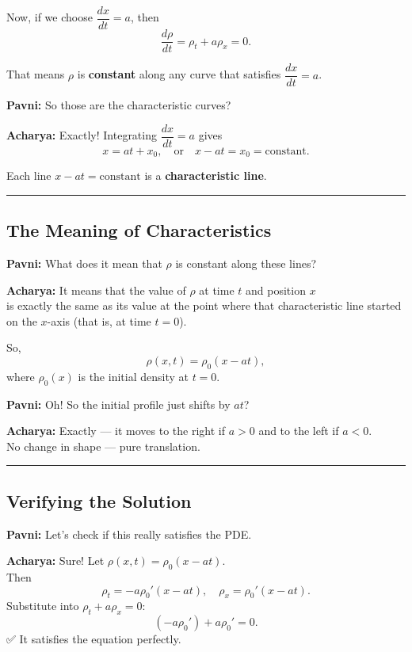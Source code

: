 \documentclass[
  letterpaper,
]{book}
\begin{document}
Now, if we choose \(\dfrac{dx}{dt} = a\), then \[
\frac{d\rho}{dt} = \rho_t + a\rho_x = 0.
\]

That means \(\rho\) is \textbf{constant} along any curve that satisfies
\(\dfrac{dx}{dt} = a\).

\textbf{Pavni:} So those are the characteristic curves?

\textbf{Acharya:} Exactly! Integrating \(\dfrac{dx}{dt} = a\) gives \[
x = a t + x_0, \quad \text{or} \quad x - a t = x_0 = \text{constant}.
\]

Each line \(x - a t = \text{constant}\) is a \textbf{characteristic
line}.

\begin{center}\rule{0.5\linewidth}{0.5pt}\end{center}

\subsection{The Meaning of
Characteristics}\label{the-meaning-of-characteristics}

\textbf{Pavni:} What does it mean that \(\rho\) is constant along these
lines?

\textbf{Acharya:} It means that the value of \(\rho\) at time \(t\) and
position \(x\)\\
is exactly the same as its value at the point where that characteristic
line started on the \(x\)-axis (that is, at time \(t=0\)).

So, \[
\rho(x,t) = \rho_0(x - a t),
\] where \(\rho_0(x)\) is the initial density at \(t=0\).

\textbf{Pavni:} Oh! So the initial profile just shifts by \(a t\)?

\textbf{Acharya:} Exactly --- it moves to the right if \(a>0\) and to
the left if \(a<0\).\\
No change in shape --- pure translation.

\begin{center}\rule{0.5\linewidth}{0.5pt}\end{center}

\subsection{Verifying the Solution}\label{verifying-the-solution}

\textbf{Pavni:} Let's check if this really satisfies the PDE.

\textbf{Acharya:} Sure! Let \(\rho(x,t) = \rho_0(x - a t)\).\\
Then \[
\rho_t = -a\rho_0'(x - a t), \quad \rho_x = \rho_0'(x - a t).
\] Substitute into \(\rho_t + a\rho_x = 0\): \[
(-a\rho_0') + a\rho_0' = 0.
\] ✅ It satisfies the equation perfectly.
\end{document}
